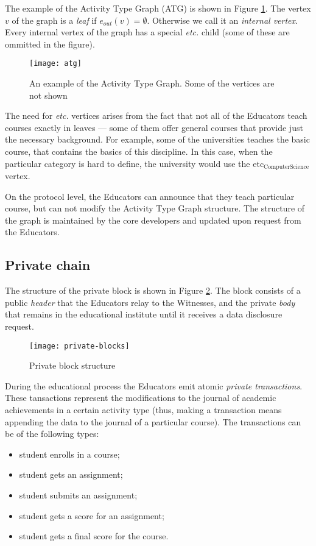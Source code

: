 The example of the Activity Type Graph (ATG) is shown in Figure \ref{fig:atg}. The vertex $v$ of the graph is a \textit{leaf} if $e_{out}(v) = \emptyset$. Otherwise we call it an \textit{internal vertex}. Every internal vertex of the graph has a special \textit{etc.} child (some of these are ommitted in the figure).

\begin{figure}[ht]
\centering
\texttt{[image: atg]}
\caption{An example of the Activity Type Graph. Some of the vertices are not shown}
\label{fig:atg}
\end{figure}

The need for \textit{etc.} vertices arises from the fact that not all of the Educators teach courses exactly in leaves — some of them offer general courses that provide just the necessary background. For example, some of the universities teaches the basic  course, that contains the basics of this discipline. In this case, when the particular category is hard to define, the university would use the $\textrm{etc}_{\textrm{ComputerScience}}$ vertex.

On the protocol level, the Educators can announce that they teach particular course, but can not modify the Activity Type Graph structure. The structure of the graph is maintained by the core developers and updated upon request from the Educators.

\subsection{Private chain}

The structure of the private block is shown in Figure \ref{fig:privateblocks}. The block consists of a public \textit{header} that the Educators relay to the Witnesses, and the private \textit{body} that remains in the educational institute until it receives a data disclosure request.

\begin{figure}[ht]
\centering
\texttt{[image: private-blocks]}
\caption{Private block structure}
\label{fig:privateblocks}
\end{figure}

During the educational process the Educators emit atomic \textit{private transactions}. These tansactions represent the modifications to the journal of academic achievements in a certain activity type (thus, making a transaction means appending the data to the journal of a particular course). The transactions can be of the following types:
\begin{itemize}
\item student enrolls in a course;
\item student gets an assignment;
\item student submits an assignment;
\item student gets a score for an assignment;
\item student gets a final score for the course.
\end{itemize}

